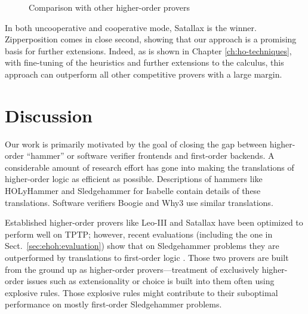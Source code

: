 \begin{figure}[t]
  \label{fig:higher-order-provers}
  \begin{center}
    \def\arraystretch{1.1}%
    \caption{Comparison with other higher-order provers}
  \end{center}
\end{figure}

In both uncooperative and cooperative mode, Satallax is the winner. Zipperposition comes
in close second, showing that our approach is a promising basis for further
extensions. Indeed, as is shown in Chapter \ref{ch:ho-techniques}, with
fine-tuning of the heuristics and further extensions to the calculus, this
approach can outperform all other competitive provers with a large margin.

\section{Discussion}
\label{sect:bool:discussion}

Our work is primarily motivated by the goal of closing the gap between
higher-order ``hammer'' or software verifier frontends and first-order backends.
A considerable amount of research effort has gone into making the translations of
higher-order logic as efficient as possible. Descriptions of hammers like
HOLyHammer \cite{ku-15-holyhammer} and Sledgehammer
\cite{pb-12-sh} for Isabelle contain details of these
translations. Software verifiers Boogie \cite{lr-10-boogie} and Why3
\cite{bfcp-11-why3} use similar translations.

Established higher-order provers like Leo-III and Satallax
have been optimized to perform well on TPTP; however, recent evaluations (including the one in Sect.~\ref{sec:ehoh:evaluation}) show that on Sledgehammer
problems they are outperformed by translations to first-order logic
\cite{bbtvw-21-sup-lam, %
cbetal-11-cvc4}. Those two provers are built from the ground up as
higher-order provers---treatment of exclusively higher-order issues such as
extensionality or choice is built into them often using explosive rules. Those
explosive rules might contribute to their suboptimal performance on mostly
first-order Sledgehammer problems.

